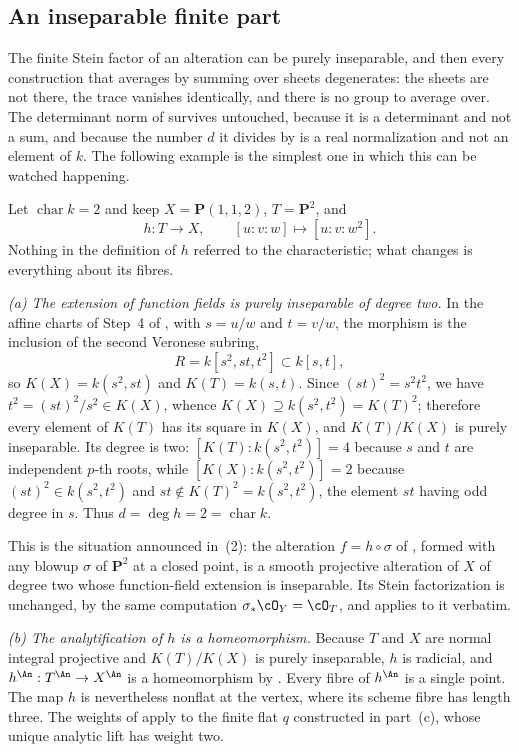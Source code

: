 \subsection{An inseparable finite part}
\label{sec:ch42-inseparable}

The finite Stein factor of an alteration can be purely inseparable, and then
every construction that averages by summing over sheets degenerates: the
sheets are not there, the trace vanishes identically, and there is no group
to average over.  The determinant norm of 
survives untouched, because it is a determinant and not a sum, and because
the number $d$ it divides by is a real normalization and not an element of
$k$.  The following example is the simplest one in which this can be
watched happening.

\begin{example}
\label{ex:ch42-inseparable-cone}
Let $\operatorname{char}k=2$ and keep
$X=\mathbf P(1,1,2)$, $T=\mathbf P^2$, and
\[
 h:T\longrightarrow X,\qquad [u:v:w]\longmapsto[u:v:w^2].
\]
Nothing in the definition of $h$ referred to the characteristic; what
changes is everything about its fibres.

\emph{(a) The extension of function fields is purely inseparable of degree
two.}
In the affine charts of Step~4 of , with
$s=u/w$ and $t=v/w$, the morphism is the inclusion of the second
Veronese subring,
\[
 R=k[s^2,st,t^2]\subset k[s,t],
\]
so $K(X)=k(s^2,st)$ and $K(T)=k(s,t)$.  Since
$(st)^2=s^2t^2$, we have $t^2=(st)^2/s^2\in K(X)$, whence
$K(X)\supseteq k(s^2,t^2)=K(T)^2$; therefore every element of $K(T)$ has
its square in $K(X)$, and $K(T)/K(X)$ is purely inseparable.  Its degree
is two: $[K(T):k(s^2,t^2)]=4$ because $s$ and $t$ are independent
$p$-th roots, while $[K(X):k(s^2,t^2)]=2$ because $(st)^2\in k(s^2,t^2)$
and $st\notin K(T)^2=k(s^2,t^2)$, the element $st$ having odd degree in
$s$.  Thus $d=\deg h=2=\operatorname{char}k$.

This is the situation announced in
\,(2): the alteration
$f=h\circ\sigma$ of , formed with any blowup
$\sigma$ of $\mathbf P^2$ at a closed point, is a smooth projective
alteration of $X$ of degree two whose function-field extension is
inseparable.  Its Stein factorization is unchanged, by the same computation
$\sigma_*\cO_Y=\cO_T$, and
 applies to it verbatim.

\emph{(b) The analytification of $h$ is a homeomorphism.}
Because $T$ and $X$ are normal integral projective and $K(T)/K(X)$ is
purely inseparable, $h$ is radicial, and
$h^{\An}:T^{\An}\to X^{\An}$ is a homeomorphism by
.  Every fibre of $h^{\An}$ is a single point.
The map $h$ is nevertheless nonflat at the vertex, where its scheme
fibre has length three.  The weights of
 apply to the finite flat $q$
constructed in part~(c), whose unique analytic lift has weight two.


\end{example}
